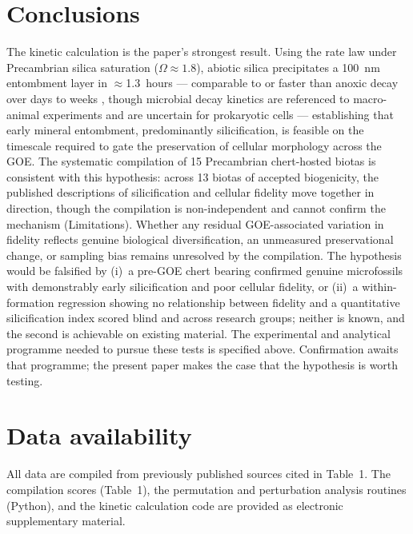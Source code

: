 \documentclass[11pt]{article}
\begin{document}
\section{Conclusions}

The kinetic calculation is the paper's strongest result. Using the \citet{Rimstidt1980} rate law under
Precambrian silica saturation ($\Omega \approx 1.8$), abiotic silica precipitates a 100~nm entombment
layer in $\approx$1.3~hours --- comparable to or faster than anoxic decay over days to weeks
\citep{TaxonRedox2025}, though microbial decay kinetics are referenced to macro-animal experiments and
are uncertain for prokaryotic cells --- establishing that early mineral entombment, predominantly
silicification, is feasible on the timescale required to gate the preservation of cellular morphology
across the GOE. The systematic compilation of 15 Precambrian chert-hosted biotas is consistent with
this hypothesis: across 13 biotas of accepted biogenicity, the published descriptions of silicification
and cellular fidelity move together in direction, though the compilation is non-independent and cannot
confirm the mechanism (Limitations). Whether any residual GOE-associated variation in fidelity reflects
genuine biological diversification, an unmeasured preservational change, or sampling bias remains
unresolved by the compilation. The hypothesis would be falsified by (i)~a pre-GOE chert bearing
confirmed genuine microfossils with demonstrably early silicification and poor cellular fidelity, or
(ii)~a within-formation regression showing no relationship between fidelity and a quantitative
silicification index scored blind and across research groups; neither is known, and the second is
achievable on existing material. The experimental and analytical programme needed to pursue these
tests is specified above. Confirmation awaits that programme; the present paper makes the case that the
hypothesis is worth testing.

\section*{Data availability}
All data are compiled from previously published sources cited in Table~1. The compilation scores
(Table~1), the permutation and perturbation analysis routines (Python), and the kinetic calculation
code are provided as electronic supplementary material.
\end{document}
